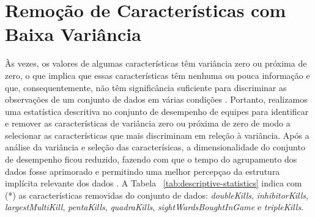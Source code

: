 \section{Remoção de Características com Baixa Variância}
Às vezes, os valores de algumas características têm variância zero ou próxima de zero, o que implica que essas características têm nenhuma ou pouca informação e que, consequentemente, não têm significância suficiente para discriminar as observações de um conjunto de dados em várias condições \cite{qing2014feature}. Portanto, realizamos uma estatística descritiva no conjunto de desempenho de equipes para identificar e remover as características de variância zero ou próxima de zero de modo a selecionar as características que mais discriminam em releção à variância. Após a análise da variância e seleção das caracterísicas, a dimensionalidade do conjunto de desempenho ficou reduzido, fazendo com que o tempo do agrupamento dos dados fosse aprimorado e permitindo uma melhor percepçao da estrutura implícita relevante dos dados \cite{boutsidis2009unsupervised}. A Tabela ~\ref{tab:descriptive-statistics} indica com (*) as características removidas do conjunto de dados: \textit{doubleKills}, \textit{inhibitorKills}, \textit {largestMultiKill}, \textit{pentaKills}, \textit {quadraKills}, \textit {sightWardsBoughtInGame} e \textit{tripleKills}.




